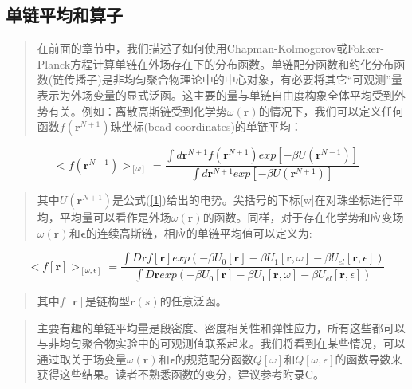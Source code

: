 \subsection{单链平均和算子}
\begin{quotation}
在前面的章节中，我们描述了如何使用Chapman-Kolmogorov或Fokker-Planck方程计算单链在外场存在下的分布函数。单链配分函数和约化分布函数(链传播子)是非均匀聚合物理论中的中心对象，有必要将其它“可观测”量表示为外场变量的显式泛函。这主要的量与单链自由度构象全体平均受到外势有关。例如：离散高斯链受到化学势$\omega (\mathbf{r})$的情况下，我们可以定义任何函数$f(\mathbf{r}^{N+1})$珠坐标(bead coordinates)的单链平均：
\end{quotation}
\begin{equation}\label{1}
<f(\mathbf{r}^{N+1})>_{[\omega]}= \frac{\int d \mathbf{r}^{N+1} f(\mathbf{r}^{N+1})exp[-\beta U(\mathbf{r}^{N+1})]}{\int d\mathbf{r}^{N+1}exp[-\beta U(\mathbf{r}^{N+1})]}
\end{equation}
\begin{quotation}
其中$U(\mathbf{r}^{N+1})$是公式(\ref{1})给出的电势。尖括号的下标[w]在对珠坐标进行平均，平均量可以看作是外场$\omega(\mathbf{r})$的函数。同样，对于存在化学势和应变场$\omega(\mathbf{r})$和$\mathbf{\epsilon}$的连续高斯链，相应的单链平均值可以定义为:
\end{quotation}
\begin{equation}\label{2}
<f[\mathbf{r}]>_{[\omega ,\epsilon]}=\frac{\int D\mathbf{r}f[\mathbf{r}]exp(-\beta U_{0}[\mathbf{r}]-\beta U_{1}[\mathbf{r},\omega]-\beta U_{el}[\mathbf{r},\epsilon])}{\int D\mathbf{r}exp(-\beta U_{0}[\mathbf{r}]-\beta U_{1}[\mathbf{r},\omega]-\beta U_{el}[\mathbf{r},\epsilon])}
\end{equation}
\begin{quotation}
其中$f[\mathbf{r}]$是链构型$\mathbf{r}(s)$的任意泛函。
\end{quotation}
\begin{quotation}
主要有趣的单链平均量是段密度、密度相关性和弹性应力，所有这些都可以与非均匀聚合物实验中的可观测值联系起来。我们将看到在某些情况，可以通过取关于场变量$\omega(\mathbf{r})$和$\mathbf{\epsilon}$的规范配分函数$Q[\omega]$和$Q[\omega,\epsilon]$的函数导数来获得这些结果。读者不熟悉函数的变分，建议参考附录C。
\end{quotation}
